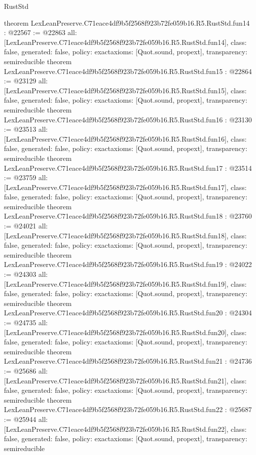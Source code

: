 \begin{lexlean}{RustStd}
\begin{coremodule}
{}
theorem LexLeanPreserve.C71eace4df9b5f2568f923b72fe059b16.R5.RustStd.fun14 : @22567 := @22863 {
  all: [LexLeanPreserve.C71eace4df9b5f2568f923b72fe059b16.R5.RustStd.fun14],
  class: false,
  generated: false,
  policy: exact{axioms: [Quot.sound, propext]},
  transparency: semireducible
}
theorem LexLeanPreserve.C71eace4df9b5f2568f923b72fe059b16.R5.RustStd.fun15 : @22864 := @23129 {
  all: [LexLeanPreserve.C71eace4df9b5f2568f923b72fe059b16.R5.RustStd.fun15],
  class: false,
  generated: false,
  policy: exact{axioms: [Quot.sound, propext]},
  transparency: semireducible
}
theorem LexLeanPreserve.C71eace4df9b5f2568f923b72fe059b16.R5.RustStd.fun16 : @23130 := @23513 {
  all: [LexLeanPreserve.C71eace4df9b5f2568f923b72fe059b16.R5.RustStd.fun16],
  class: false,
  generated: false,
  policy: exact{axioms: [Quot.sound, propext]},
  transparency: semireducible
}
theorem LexLeanPreserve.C71eace4df9b5f2568f923b72fe059b16.R5.RustStd.fun17 : @23514 := @23759 {
  all: [LexLeanPreserve.C71eace4df9b5f2568f923b72fe059b16.R5.RustStd.fun17],
  class: false,
  generated: false,
  policy: exact{axioms: [Quot.sound, propext]},
  transparency: semireducible
}
theorem LexLeanPreserve.C71eace4df9b5f2568f923b72fe059b16.R5.RustStd.fun18 : @23760 := @24021 {
  all: [LexLeanPreserve.C71eace4df9b5f2568f923b72fe059b16.R5.RustStd.fun18],
  class: false,
  generated: false,
  policy: exact{axioms: [Quot.sound, propext]},
  transparency: semireducible
}
theorem LexLeanPreserve.C71eace4df9b5f2568f923b72fe059b16.R5.RustStd.fun19 : @24022 := @24303 {
  all: [LexLeanPreserve.C71eace4df9b5f2568f923b72fe059b16.R5.RustStd.fun19],
  class: false,
  generated: false,
  policy: exact{axioms: [Quot.sound, propext]},
  transparency: semireducible
}
theorem LexLeanPreserve.C71eace4df9b5f2568f923b72fe059b16.R5.RustStd.fun20 : @24304 := @24735 {
  all: [LexLeanPreserve.C71eace4df9b5f2568f923b72fe059b16.R5.RustStd.fun20],
  class: false,
  generated: false,
  policy: exact{axioms: [Quot.sound, propext]},
  transparency: semireducible
}
theorem LexLeanPreserve.C71eace4df9b5f2568f923b72fe059b16.R5.RustStd.fun21 : @24736 := @25686 {
  all: [LexLeanPreserve.C71eace4df9b5f2568f923b72fe059b16.R5.RustStd.fun21],
  class: false,
  generated: false,
  policy: exact{axioms: [Quot.sound, propext]},
  transparency: semireducible
}
theorem LexLeanPreserve.C71eace4df9b5f2568f923b72fe059b16.R5.RustStd.fun22 : @25687 := @25944 {
  all: [LexLeanPreserve.C71eace4df9b5f2568f923b72fe059b16.R5.RustStd.fun22],
  class: false,
  generated: false,
  policy: exact{axioms: [Quot.sound, propext]},
  transparency: semireducible
}
\end{coremodule}
\end{lexlean}
